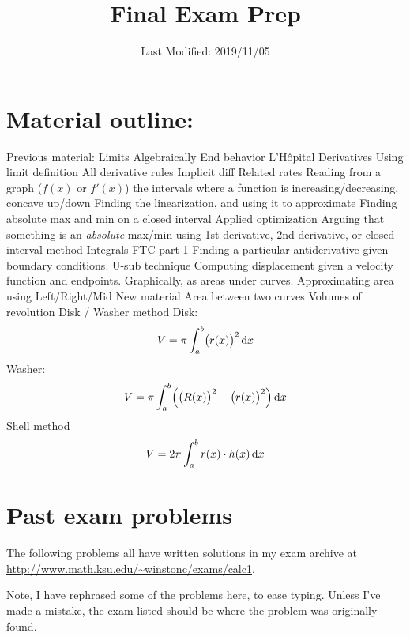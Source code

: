 \documentclass[10pt]{scrartcl}
\title{Final Exam Prep}
\date{Last Modified: 2019/11/05}
\author{}
\begin{document}
\maketitle
\tableofcontents


\section{Material outline:}
\begin{outline}
  \1 Previous material:
  \2 Limits
  \3 Algebraically
  \3 End behavior
  \3 L'H\^{o}pital
  \2 Derivatives
  \3 Using limit definition
  \3 All derivative rules
  \3 Implicit diff
  \3 Related rates
  \3 Reading from a graph ($f(x)$ or $f'(x)$) the intervals where a function is increasing/decreasing, concave up/down
  \3 Finding the linearization, and using it to approximate
  \3 Finding absolute max and min on a closed interval
  \3 Applied optimization
  \4 Arguing that something is an \emph{absolute} max/min using  1st derivative, 2nd derivative, or closed interval method
  \2 Integrals
  \3 FTC part 1
  \3 Finding a particular antiderivative given boundary conditions.
  \3 U-sub technique
  \3 Computing displacement given a velocity function and endpoints.
  \3 Graphically, as areas under curves.
  \3 Approximating area using Left/Right/Mid
  \1 New material
  \2 Area between two curves
  \2 Volumes of revolution
  \3 Disk / Washer method
  \4 Disk:
  \[
    V = \pi \int_a^b \bigl( r(x) \bigr)^2 \dif x
  \]
  \4 Washer:
  \[
    V = \pi \int_a^b \Bigl( \bigl( R(x) \bigr)^2 - \bigl( r(x) \bigr)^2 \Bigr) \dif x
  \]
  \3 Shell method
  \[
    V = 2\pi \int_a^b r(x) \cdot h(x) \dif x
  \]
\end{outline}

\section{Past exam problems}
The following problems all have written solutions in my exam archive at \url{http://www.math.ksu.edu/\~winstonc/exams/calc1}.

Note, I have rephrased some of the problems here, to ease typing. 
Unless I've made a mistake, the exam listed should be where the problem was originally found.
\end{document}
